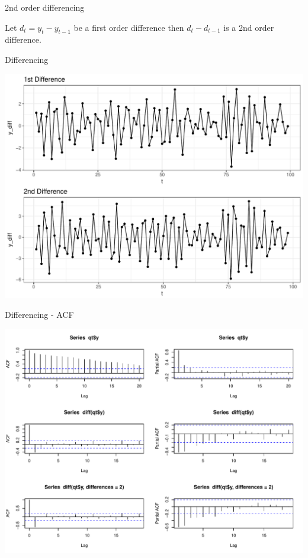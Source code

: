 \documentclass[11pt,ignorenonframetext,]{beamer}
\begin{document}
\begin{frame}[t]{2nd order differencing}

Let \(d_t = y_t - y_{t-1}\) be a first order difference then
\(d_t - d_{t-1}\) is a 2nd order difference.

\end{frame}

\begin{frame}{Differencing}

\includegraphics{Lec7_files/figure-beamer/unnamed-chunk-18-1.pdf}

\end{frame}

\begin{frame}{Differencing - ACF}

\begin{center}\includegraphics{Lec7_files/figure-beamer/unnamed-chunk-19-1} \end{center}

\end{frame}
\end{document}
